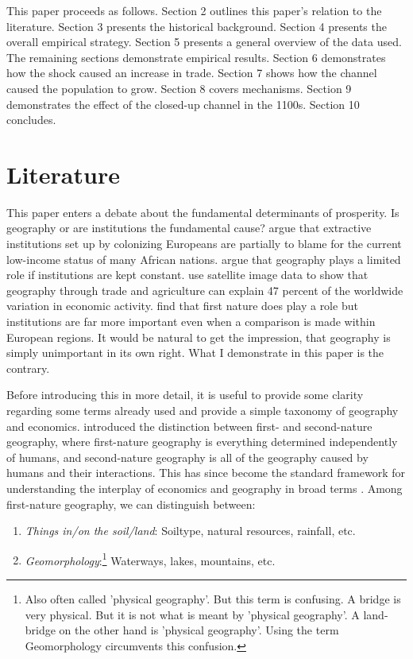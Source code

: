 \documentclass[11pt]{article}
\begin{document}
This paper proceeds as follows. Section 2 outlines this paper's relation to the literature. Section 3 presents the historical background. Section 4 presents the overall empirical strategy. Section 5 presents a general overview of the data used. The remaining sections demonstrate empirical results. Section 6 demonstrates how the shock caused an increase in trade. Section 7 shows how the channel caused the population to grow. Section 8 covers mechanisms. Section 9 demonstrates the effect of the closed-up channel in the 1100s. Section 10 concludes. 

\section{Literature}

This paper enters a debate about the fundamental determinants of prosperity. Is geography or are institutions the fundamental cause? \cite{Acemoglu2001} argue that extractive institutions set up by colonizing Europeans are partially to blame for the current low-income status of many African nations. \cite{rodrik2004institutions} argue that geography plays a limited role if institutions are kept constant. \cite{Henderson2018satelite} use satellite image data to show that geography through trade and agriculture can explain 47 percent of the worldwide variation in economic activity. \cite{Ketterer2018} find that first nature does play a role but institutions are far more important even when a comparison is made within European regions. It would be natural to get the impression, that geography is simply unimportant in its own right. What I demonstrate in this paper is the contrary.  

Before introducing this in more detail, it is useful to provide some clarity regarding some terms already used and provide a simple taxonomy of geography and economics. \cite{cronon1992nature} introduced the distinction between first- and second-nature geography, where first-nature geography is everything determined independently of humans, and second-nature geography is all of the geography caused by humans and their interactions. This has since become the standard framework for understanding the interplay of economics and geography in broad terms \citep{Caruana-Galizia_Okubo_Wolf_2021}. Among first-nature geography, we can distinguish between:
\begin{enumerate}
    \item \textit{Things in/on the soil/land}: Soiltype, natural resources, rainfall, etc.
    \item \textit{Geomorphology}:\footnote{Also often called 'physical geography'. But this term is confusing. A bridge is very physical. But it is not what is meant by 'physical geography'. A land-bridge on the other hand is 'physical geography'. Using the term Geomorphology circumvents this confusion.} Waterways, lakes, mountains, etc.
\end{enumerate}
\end{document}
